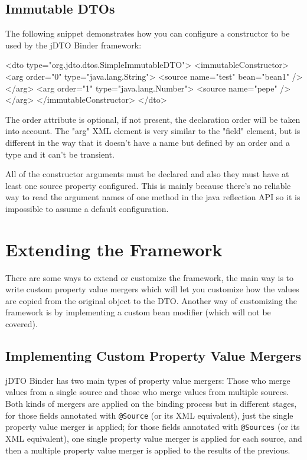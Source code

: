 \documentclass[11pt]{article}
\newcommand{\JDTO}{jDTO Binder\xspace}
\begin{document}
\subsection{Immutable DTOs}

The following snippet demonstrates how you can configure a constructor to be used by the \JDTO framework:

\begin{xml}
<dto type="org.jdto.dtos.SimpleImmutableDTO">
    <immutableConstructor>
        <arg order="0" type="java.lang.String">
            <source name="test" bean="bean1" />
        </arg>
        <arg order="1" type="java.lang.Number">
            <source name="pepe" />
        </arg>
    </immutableConstructor>
</dto>
\end{xml}

The order attribute is optional, if not present, the declaration order will be taken into account. The "arg" XML element is very similar to the "field" element, but is different in the way that it doesn't have a name but defined by an order and a type and it can't be transient. 

All of the constructor arguments must be declared and also they must have at least one source property configured. This is mainly because there's no reliable way to read the argument names of one method in the java reflection API so it is impossible to assume a default configuration.


\section{Extending the Framework}

There are some ways to extend or customize the framework, the main way is to write custom property value mergers which will let you customize how the values are copied from the original object to the DTO. Another way of customizing the framework is by implementing a custom bean modifier (which will not be covered). 


\subsection{Implementing Custom Property Value Mergers}

\JDTO has two main types of property value mergers: Those who merge values from a single source and those who merge values from multiple sources. Both kinds of mergers are applied on the binding process but in different stages, for those fields annotated with \texttt{@Source} (or its XML equivalent), just the single property value merger is applied; for those fields annotated with \texttt{@Sources} (or its XML equivalent), one single property value merger is applied for each source, and then a multiple property value merger is applied to the results of the previous.
\end{document}
